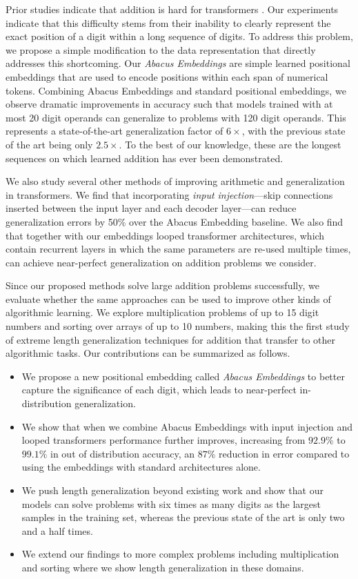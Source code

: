 \documentclass{article}
\begin{document}
Prior studies indicate that addition is hard for transformers \citep{lee2023teaching, shen2023positional, zhou2023algorithms, zhou2024transformers}. 
Our experiments indicate that this difficulty stems from their inability to clearly represent the exact position of a digit within a long sequence of digits.  To address this problem, we propose a simple modification to the data representation that directly addresses this shortcoming. 
Our \textit{Abacus Embeddings} are simple learned positional embeddings that are used to encode positions within each span of numerical tokens. 
Combining Abacus Embeddings and standard positional embeddings, we observe dramatic improvements in accuracy such that models trained with at most 20 digit operands can generalize to problems with 120 digit operands. This represents a state-of-the-art generalization factor of \(6\times\), with the previous state of the art being only \(2.5\times\). 
To the best of our knowledge, these are the longest sequences on which learned addition has ever been demonstrated.

We also study several other methods of improving arithmetic and generalization in transformers.  
We find that incorporating \textit{input injection}---skip connections inserted between the input layer and each decoder layer---can reduce generalization errors by 50\% over the Abacus Embedding baseline. 
We also find that together with our embeddings looped transformer architectures, which contain recurrent layers in which the same parameters are re-used multiple times, can achieve near-perfect generalization on addition problems we consider.

Since our proposed methods solve large addition problems successfully, we evaluate whether the same approaches can be used to improve other kinds of algorithmic learning. 
We explore multiplication problems of up to 15 digit numbers and sorting over arrays of up to 10 numbers, making this the first study of extreme length generalization techniques for addition that transfer to other algorithmic tasks.
Our contributions can be summarized as follows.
\begin{itemize}
    \item We propose a new positional embedding called \emph{Abacus Embeddings} to better capture the significance of each digit, which leads to near-perfect in-distribution generalization.
    \item We show that when we combine Abacus Embeddings with input injection and looped transformers performance further improves, increasing from \(92.9\%\) to \(99.1\%\) in out of distribution accuracy, an $87\%$ reduction in error compared to using the embeddings with standard architectures alone. 
    \item We push length generalization beyond existing work and show that our models can solve problems with six times as many digits as the largest samples in the training set, whereas the previous state of the art is only two and a half times.
    \item We extend our findings to more complex problems including multiplication and sorting where we show length generalization in these domains.
\end{itemize}
\end{document}
